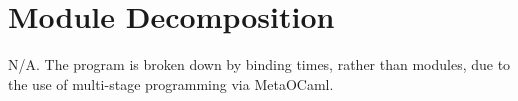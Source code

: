 \documentclass[12pt, titlepage]{article}
\newcommand{\mref}[1]{M\ref{#1}}
\begin{document}
\section{Module Decomposition} \label{SecMD}
N/A. The program is broken down by binding times, rather than modules, due to 
the use of multi-stage programming via MetaOCaml.
%
%
%
%
%
%
\end{document}
